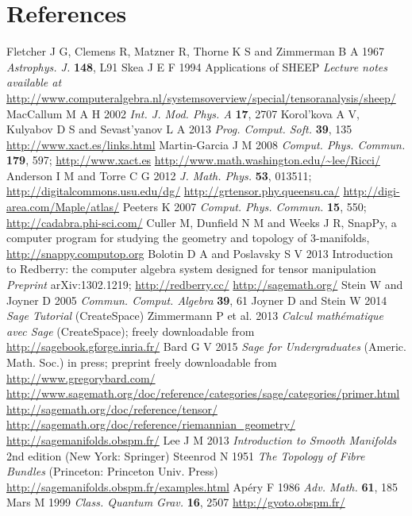 \documentclass[a4paper]{jpconf}
\begin{document}
\section*{References}
\begin{thebibliography}{10}
Fletcher J G, Clemens R, Matzner R, Thorne K S and Zimmerman B A 1967
{\it Astrophys. J.} {\bf 148}, L91
Skea J E F 1994 Applications of SHEEP {\it Lecture notes available at}
\url{http://www.computeralgebra.nl/systemsoverview/special/tensoranalysis/sheep/}
MacCallum M A H 2002 {\it Int. J. Mod. Phys. A} {\bf 17}, 2707 
Korol'kova A V, Kulyabov D S and Sevast'yanov L A 2013 {\it Prog. Comput. Soft.} 
{\bf 39}, 135
\url{http://www.xact.es/links.html}
Martin-Garcia J M 2008 {\it Comput. Phys. Commun.} {\bf 179}, 597; 
\url{http://www.xact.es}
\url{http://www.math.washington.edu/~lee/Ricci/}
Anderson I M and Torre C G 2012 {\it J. Math. Phys.} {\bf 53}, 013511; 
\url{http://digitalcommons.usu.edu/dg/}
\url{http://grtensor.phy.queensu.ca/}
\url{http://digi-area.com/Maple/atlas/}
Peeters K 2007 {\it Comput. Phys. Commun.} {\bf 15}, 550;
\url{http://cadabra.phi-sci.com/}
Culler M, Dunfield N M and Weeks J R, SnapPy, a computer program for studying the geometry and topology of 3-manifolds, \url{http://snappy.computop.org}
Bolotin D A and Poslavsky S V 2013 Introduction to Redberry: the computer algebra system designed for tensor manipulation {\it Preprint} arXiv:1302.1219;
\url{http://redberry.cc/}
\url{http://sagemath.org/}
Stein W and Joyner D 2005 {\it Commun. Comput. Algebra} {\bf 39}, 61
Joyner D and Stein W 2014 {\it Sage Tutorial} (CreateSpace)
Zimmermann P et al. 2013 {\it Calcul math\'ematique avec Sage} (CreateSpace); 
freely downloadable from \url{http://sagebook.gforge.inria.fr/}
Bard G V 2015 {\it Sage for Undergraduates} (Americ. Math. Soc.) in press;
preprint freely downloadable from \url{http://www.gregorybard.com/}
\url{http://www.sagemath.org/doc/reference/categories/sage/categories/primer.html}
\url{http://sagemath.org/doc/reference/tensor/}
\url{http://sagemath.org/doc/reference/riemannian_geometry/}
\url{http://sagemanifolds.obspm.fr/}
Lee J M 2013 {\it Introduction to Smooth Manifolds} 2nd edition (New York: Springer)
Steenrod N 1951 {\it The Topology of Fibre Bundles} (Princeton: Princeton Univ. Press)
\url{http://sagemanifolds.obspm.fr/examples.html}
Ap\'ery F 1986 {\it Adv. Math.} {\bf 61}, 185
Mars M 1999 {\it Class. Quantum Grav.} {\bf 16}, 2507
\url{http://gyoto.obspm.fr/}
\end{thebibliography}
\end{document}
